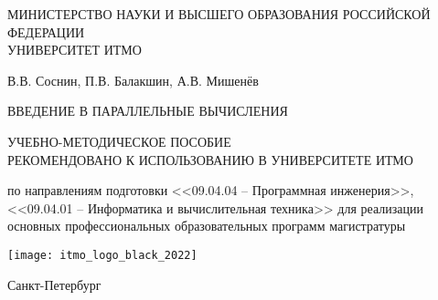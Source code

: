 \thispagestyle{empty}

\begin{center}
    \noindent МИНИСТЕРСТВО НАУКИ И ВЫСШЕГО ОБРАЗОВАНИЯ РОССИЙСКОЙ ФЕДЕРАЦИИ
    \\[\baselineskip]
    УНИВЕРСИТЕТ ИТМО
    \\[2\baselineskip]
    \begin{bfseries}
        \begin{Large}
            В.В. Соснин, П.В. Балакшин, А.В. Мишенёв 
            \\[\baselineskip]
            \centerline{ВВЕДЕНИЕ В ПАРАЛЛЕЛЬНЫЕ ВЫЧИСЛЕНИЯ}
        \end{Large}
    \end{bfseries}
    
    \bigskip
    
    УЧЕБНО-МЕТОДИЧЕСКОЕ ПОСОБИЕ
    \\[\baselineskip]
    РЕКОМЕНДОВАНО К ИСПОЛЬЗОВАНИЮ В УНИВЕРСИТЕТЕ ИТМО
        
    по направлениям подготовки <<09.04.04 -- Программная инженерия>>, <<09.04.01 -- Информатика и вычислительная техника>> для реализации основных профессиональных образовательных программ магистратуры

    \vspace{\fill}

    \texttt{[image: itmo\_logo\_black\_2022]}

    \bigskip

    \begin{bfseries}
        \begin{large}
            Санкт-Петербург \\ 
            \the\year
        \end{large}
    \end{bfseries}
    
\end{center}
